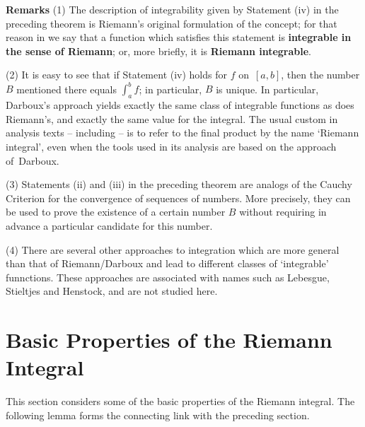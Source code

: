 \V

        {\bf Remarks} (1) The description of integrability given by Statement (iv) in the preceding theorem is Riemann's original formulation of the concept;
    for that reason in {\ThisText} we say that a function which satisfies this statement is {\bf integrable in the sense of Riemann};
    or, more briefly, it is {\bf Riemann integrable}.

\V

        (2) It is easy to see that if Statement (iv) holds for $f$ on~$[a,b]$, then the number $B$ mentioned there equals ${\displaystyle \int_{a}^{b} f}$; in particular, $B$ is unique.
    In particular, Darboux's approach yields exactly the same class of integrable functions as does Riemann's, and exactly the same value for the integral.
    The usual custom in analysis texts -- including {\ThisText} -- is to refer to the final product by the name `Riemann integral', even when the tools used in its analysis are based on the approach of~Darboux.

\V

        (3) Statements (ii) and (iii) in the preceding theorem are analogs of the Cauchy Criterion for the convergence of sequences of numbers.
    More precisely, they can be used to prove the existence of a certain number $B$ without requiring in advance a particular candidate for this number.

\V

        (4) There are several other approaches to integration which are more general than that of Riemann/Darboux and lead to different classes of `integrable' funnctions.
    These approaches are associated with names such as Lebesgue, Stieltjes and Henstock, and are not studied here. %

\VV



        \section{{\bf Basic Properties of the Riemann Integral}}
        \label{SectH25}

\V

        This section considers some of the basic properties of the Riemann integral. The following lemma forms the connecting link with the preceding section.

